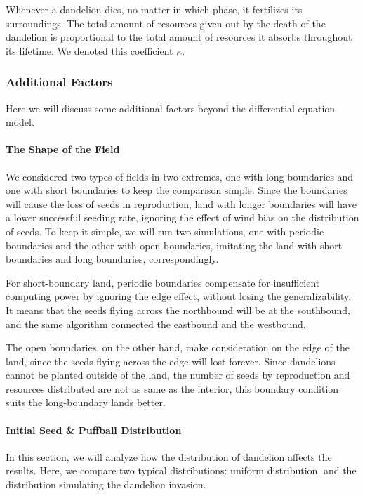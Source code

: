 \documentclass[12pt]{article}
\begin{document}
Whenever a dandelion dies, no matter in which phase, it fertilizes its surroundings. The total amount of resources given out by the death of the dandelion is proportional to the total amount of resources it absorbs throughout its lifetime. We denoted this coefficient $\kappa$.

\subsubsection{Additional Factors}
Here we will discuss some additional factors beyond the differential equation model.

\paragraph{The Shape of the Field}
We considered two types of fields in two extremes, one with long boundaries and one with short boundaries to keep the comparison simple. Since the boundaries will cause the loss of seeds in reproduction, land with longer boundaries will have a lower successful seeding rate, ignoring the effect of wind bias on the distribution of seeds. To keep it simple, we will run two simulations, one with periodic boundaries and the other with open boundaries, imitating the land with short boundaries and long boundaries, correspondingly.

For short-boundary land, periodic boundaries compensate for insufficient computing power by ignoring the edge effect, without losing the generalizability. It means that the seeds flying across the northbound will be at the southbound, and the same algorithm connected the eastbound and the westbound.

The open boundaries, on the other hand, make consideration on the edge of the land, since the seeds flying across the edge will lost forever. Since dandelions cannot be planted outside of the land, the number of seeds by reproduction and resources distributed are not as same as the interior, this boundary condition suits the long-boundary lands better.

\paragraph{Initial Seed \& Puffball Distribution}
In this section, we will analyze how the distribution of dandelion affects the results. Here, we compare two typical distributions: uniform distribution, and the distribution simulating the dandelion invasion.
\end{document}
